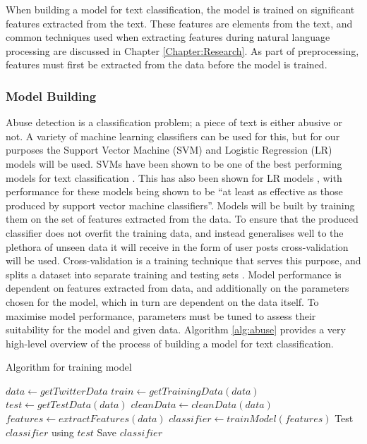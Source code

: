When building a model for text classification, the model is trained on significant features extracted from the text. These features are elements from the text, and common techniques used when extracting features during natural language processing are discussed in Chapter \ref{Chapter:Research}. As part of preprocessing, features must first be extracted from the data before the model is trained.

\subsubsection{Model Building}
Abuse detection is a classification problem; a piece of text is either abusive or not. A variety of machine learning classifiers can be used for this, but for our purposes the Support Vector Machine (SVM) and Logistic Regression (LR) models will be used. SVMs have been shown to be one of the best performing models for text classification \cite{joachims1998text}. This has also been shown for LR models \cite{genkin2007large}, with performance for these models being shown to be ``at least as effective as those produced by support vector machine classifiers''. Models will be built by training them on the set of features extracted from the data. To ensure that the produced classifier does not overfit the training data, and instead generalises well to the plethora of unseen data it will receive in the form of user posts cross-validation will be used. Cross-validation is a training technique that serves this purpose, and splits a dataset into separate training and testing sets \cite{scikit:cross-val}. Model performance is dependent on features extracted from data, and additionally on the parameters chosen for the model, which in turn are dependent on the data itself. To maximise model performance, parameters must be tuned to assess their suitability for the model and given data. Algorithm \ref{alg:abuse} provides a very high-level overview of the process of building a model for text classification.

\begin{algorithm}
\caption{Algorithm for training model}
\label{alg:abuse}
\begin{algorithmic}[1]
\State $data\gets getTwitterData$
\State $train\gets getTrainingData(data)$
\State $test\gets getTestData(data)$
\State $cleanData\gets cleanData(data)$
\State $features\gets extractFeatures(data)$
\State $classifier\gets trainModel(features)$
\State Test $classifier$ using $test$
\State Save $classifier$
\end{algorithmic}
\end{algorithm}

